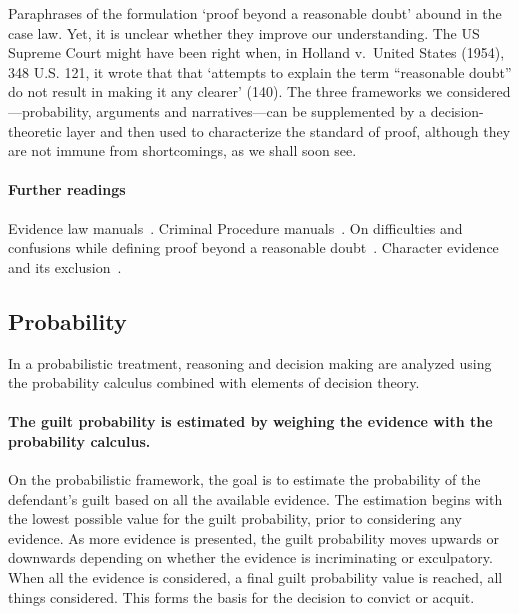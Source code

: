\documentclass[10pt]{article}
\begin{document}
Paraphrases of the formulation `proof beyond a reasonable doubt' 
abound in the case law. Yet, it is unclear 
whether they improve our understanding. The US Supreme Court might have been right when, in Holland v.\ United States (1954), 348 U.S. 121, 
it wrote that that `attempts to explain the term ``reasonable doubt'' do not result in making it any clearer' (140).
The three frameworks we considered---probability, arguments and narratives---can be supplemented by a decision-theoretic 
layer and then used to characterize the standard of proof, although they are not immune from shortcomings, 
as we shall soon see.


\paragraph{Further readings}
Evidence law manuals~\citep{fisher2008, mendez2008}. 
Criminal Procedure manuals~\citep{allenEtAl2011}.
On difficulties and confusions while defining proof 
beyond a reasonable doubt~\citep{laudan2006}.
Character evidence and 
its exclusion~\citep{redmayne2015}. 

 
 




\subsection{Probability}

In a probabilistic treatment, reasoning and decision making are analyzed using the probability calculus combined with elements of decision theory.
\paragraph{The guilt probability is estimated by weighing the evidence with the probability calculus.}

 On the probabilistic framework, the goal is to estimate the probability of the defendant's guilt based 
 on all the available evidence. The estimation begins with the lowest possible value 
for the guilt probability, prior to considering any evidence. As more evidence is presented, the guilt probability 
moves upwards or downwards depending on whether the evidence is incriminating or exculpatory. 
When all the evidence is considered, a final guilt probability value is 
reached, all things considered. This forms the basis for 
the decision to convict or acquit. 
\end{document}
